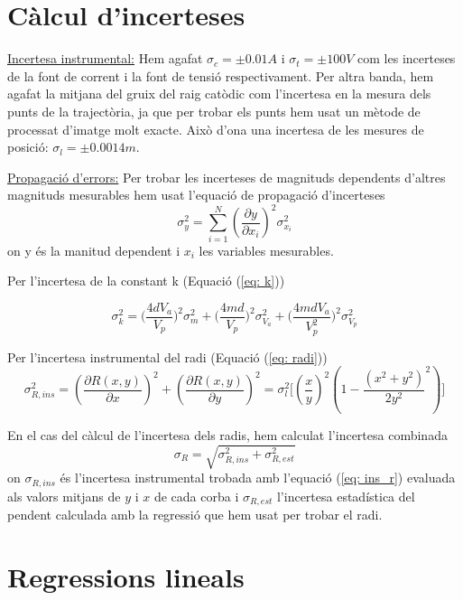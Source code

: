 \documentclass[11pt]{article}
\begin{document}
\section{Càlcul d'incerteses}\label{sec: incerteses}
\underline{Incertesa instrumental:} Hem agafat $\sigma_{c}=\pm0.01A$ i $\sigma_{t}=\pm100V$ com les incerteses de la font de corrent i la font de tensió respectivament. Per altra banda, hem agafat la mitjana del gruix del raig catòdic com  l'incertesa en la mesura dels punts de la trajectòria, ja que per trobar els punts hem usat un mètode de processat d'imatge molt exacte. Això d'ona una incertesa de les mesures de posició: $\sigma_{l}=\pm0.0014m$.

\underline{Propagació d'errors:} Per trobar les incerteses de magnituds dependents d'altres magnituds mesurables hem usat l'equació de propagació d'incerteses
\begin{equation}
    \sigma_{y}^2=\sum_{i=1}^{N}(\frac{\partial y}{\partial x_i})^2\sigma_{x_i}^2
\end{equation}
on y és la manitud dependent i ${x_i}$ les variables mesurables.

Per l'incertesa de la constant k (Equació (\ref{eq: k}))

 \begin{equation}
     \sigma^2_k=\bigg(\frac{4dV_a}{V_p}\bigg)^2\sigma_m^2 + \bigg(\frac{4md}{V_p}\bigg)^2\sigma_{V_a}^2+\bigg(\frac{4mdV_a}{V_p^2}\bigg)^2\sigma_{V_p}^2
 \end{equation}

Per l'incertesa instrumental del radi (Equació (\ref{eq: radi}))
\begin{equation}
    \sigma_{R,ins}^2 = (\frac{\partial R(x,y)}{\partial x})^2+(\frac{\partial R(x,y)}{\partial y})^2= \sigma_{l}^2\bigg[(\frac{x}{y})^2(1-\frac{(x^2+y^2)}{2y^2}^2)\bigg]
    \label{eq: ins_r}
\end{equation}

En el cas del càlcul de l'incertesa dels radis, hem calculat l'incertesa combinada 
\begin{equation}
    \sigma_{R}=\sqrt{\sigma_{R,ins}^2+\sigma_{R,est}^2}
\end{equation}
on $\sigma_{R,ins}$ és l'incertesa instrumental trobada amb l'equació (\ref{eq: ins_r}) evaluada als valors mitjans de $y$ i $x$ de cada corba i $\sigma_{R,est}$ l'incertesa estadística del pendent calculada amb la regressió que hem usat per trobar el radi.

\section{Regressions lineals} \label{sec: Reg}
\end{document}
